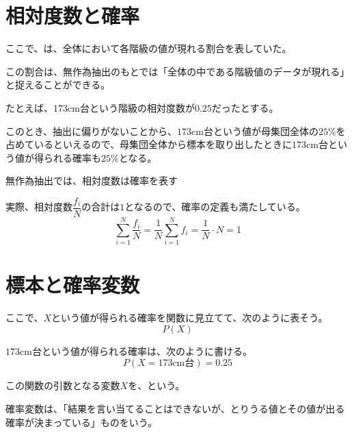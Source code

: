 \documentclass[../../../topic_statistics]{subfiles}
\begin{document}
\sectionline
\section{相対度数と確率}

ここで、は、全体において各階級の値が現れる割合を表していた。

この割合は、無作為抽出のもとでは「全体の中である階級値のデータが現れる」と捉えることができる。

\br

たとえば、$173$cm台という階級の相対度数が$0.25$だったとする。

このとき、抽出に偏りがないことから、$173$cm台という値が母集団全体の$25\%$を占めているといえるので、母集団全体から標本を取り出したときに$173$cm台という値が得られる確率も$25\%$となる。

\begin{emphabox}
  \begin{spacebox}
    \begin{center}
      無作為抽出では、相対度数は確率を表す
    \end{center}
  \end{spacebox}
\end{emphabox}

実際、相対度数$\dfrac{f_i}{N}$の合計は$1$となるので、確率の定義も満たしている。
\begin{equation*}
  \sum_{i=1}^N \frac{f_i}{N} = \frac{1}{N} \sum_{i=1}^N f_i = \frac{1}{N}\cdot N = 1
\end{equation*}

\sectionline
\section{標本と確率変数}

ここで、$X$という値が得られる確率を関数に見立てて、次のように表そう。
\begin{equation*}
  P(X)
\end{equation*}

$173$cm台という値が得られる確率は、次のように書ける。
\begin{equation*}
  P(X = 173\text{cm台}) = 0.25
\end{equation*}

この関数の引数となる変数$X$を、という。

\br

確率変数は、「結果を言い当てることはできないが、とりうる値とその値が出る確率が決まっている」ものをいう。
\end{document}
